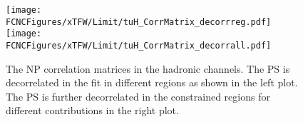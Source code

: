 \begin{figure}[H]
\centering
\texttt{[image: \\FCNCFigures/xTFW/Limit/tuH\_CorrMatrix\_decorrreg.pdf]}
\texttt{[image: \\FCNCFigures/xTFW/Limit/tuH\_CorrMatrix\_decorrall.pdf]}
\caption{ The NP correlation matrices in the hadronic channels. The PS is decorrelated in the fit in different regions as shown in the left plot. The PS is further decorrelated in the constrained regions for different contributions in the right plot. }
\label{fig:tuH_CorrMatrix_decorr_had}
\end{figure}



\newpage
